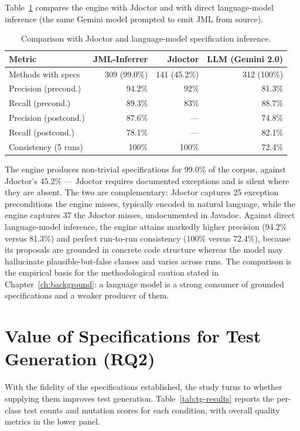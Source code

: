Table~\ref{tab:tg-comparison} compares the engine with Jdoctor and with direct
language-model inference (the same Gemini model prompted to emit JML from
source).

\begin{table}[ht]
\centering
\caption{Comparison with Jdoctor and language-model specification inference.}
\label{tab:tg-comparison}
\begin{tabular}{lrrr}
\toprule
\textbf{Metric} & \textbf{JML-Inferrer} & \textbf{Jdoctor} & \textbf{LLM (Gemini 2.0)} \\
\midrule
Methods with specs & 309 (99.0\%) & 141 (45.2\%) & 312 (100\%) \\
Precision (precond.) & 94.2\% & 92\% & 81.3\% \\
Recall (precond.) & 89.3\% & 83\% & 88.7\% \\
Precision (postcond.) & 87.6\% & --- & 74.8\% \\
Recall (postcond.) & 78.1\% & --- & 82.1\% \\
Consistency (5 runs) & 100\% & 100\% & 72.4\% \\
\bottomrule
\end{tabular}
\end{table}

The engine produces non-trivial specifications for 99.0\% of the corpus, against
Jdoctor's 45.2\% --- Jdoctor requires documented exceptions and is silent where
they are absent. The two are complementary: Jdoctor captures 25 exception
preconditions the engine misses, typically encoded in natural language, while
the engine captures 37 the Jdoctor misses, undocumented in Javadoc. Against
direct language-model inference, the engine attains markedly higher precision
(94.2\% versus 81.3\%) and perfect run-to-run consistency (100\% versus 72.4\%),
because its proposals are grounded in concrete code structure whereas the model
may hallucinate plausible-but-false clauses and varies across runs. The
comparison is the empirical basis for the methodological caution stated in
Chapter~\ref{ch:background}: a language model is a strong consumer of grounded
specifications and a weaker producer of them.

\section{Value of Specifications for Test Generation (RQ2)}
\label{sec:tg-value}

With the fidelity of the specifications established, the study turns to whether
supplying them improves test generation. Table~\ref{tab:tg-results} reports the
per-class test counts and mutation scores for each condition, with overall
quality metrics in the lower panel.

